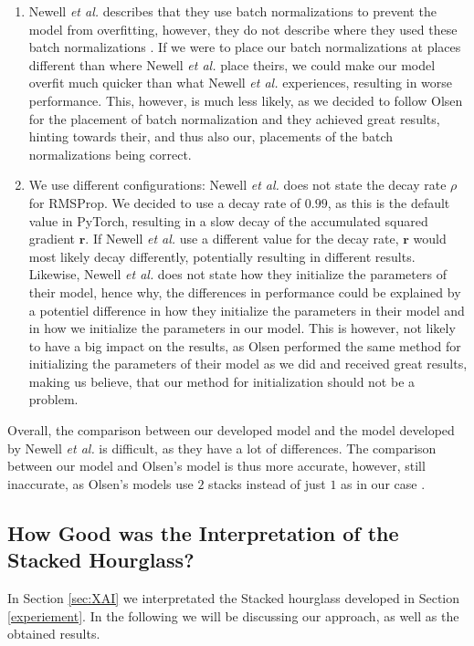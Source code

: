 \documentclass[./main.tex]{subfiles}
\begin{document}
\begin{enumerate}
    \item Newell \textit{et al.} describes that they use batch normalizations to prevent the model from overfitting, however, they do not describe where they used these batch normalizations \cite{Newell}. If we were to place our batch normalizations at places different than where Newell \textit{et al.} \cite{Newell} place theirs, we could make our model overfit much quicker than what Newell \textit{et al.} \cite{Newell} experiences, resulting in worse performance. This, however, is much less likely, as we decided to follow Olsen \cite{Camilla} for the placement of batch normalization and they achieved great results, hinting towards their, and thus also our, placements of the batch normalizations being correct.
    \item We use different configurations: Newell \textit{et al.} \cite{Newell} does not state the decay rate $\rho$ for RMSProp. We decided to use a decay rate of $0.99$, as this is the default value in PyTorch, resulting in a slow decay of the accumulated squared gradient $\bm{r}$. If Newell \textit{et al.} \cite{Newell} use a different value for the decay rate, $\bm{r}$ would most likely decay differently, potentially resulting in different results. Likewise, Newell \textit{et al.} \cite{Newell} does not state how they initialize the parameters of their model, hence why, the differences in performance could be explained by a potentiel difference in how they initialize the parameters in their model and in how we initialize the parameters in our model. This is however, not likely to have a big impact on the results, as Olsen \cite{Camilla} performed the same method for initializing the parameters of their model as we did and received great results, making us believe, that our method for initialization should not be a problem.
\end{enumerate}
Overall, the comparison between our developed model and the model developed by Newell \textit{et al.} \cite{Newell} is difficult, as they have a lot of differences. The comparison between our model and Olsen's model \cite{Camilla} is thus more accurate, however, still inaccurate, as Olsen's models use $2$ stacks instead of just $1$ as in our case \cite{Camilla}.

\subsection{How Good was the Interpretation of the Stacked Hourglass?}\label{subsec:XAI_disc}
In Section \ref{sec:XAI} we interpretated the Stacked hourglass developed in Section \ref{experiement}. In the following we will be discussing our approach, as well as the obtained results.
\end{document}
